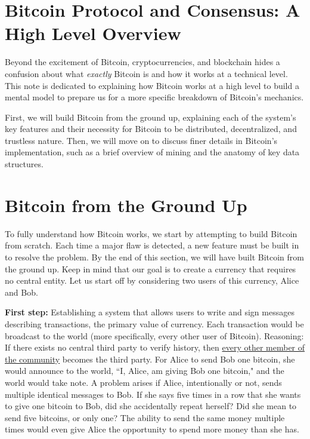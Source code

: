 \documentclass[full.tex]{subfiles}
\begin{document}
    \thispagestyle{firstpage}
    \vspace*{2\baselineskip}
    \section*{Bitcoin Protocol and Consensus: A High Level Overview}
    
    Beyond the excitement of Bitcoin, cryptocurrencies, and blockchain hides a confusion about what \textit{exactly} Bitcoin is and how it works at a technical level. This note is dedicated to explaining how Bitcoin works at a high level to build a mental model to prepare us for a more specific breakdown of Bitcoin's mechanics. 
    
    First, we will build Bitcoin from the ground up, explaining each of the system's key features and their necessity for Bitcoin to be distributed, decentralized, and trustless nature. Then, we will move on to discuss finer details in Bitcoin's implementation, such as a brief overview of mining and the anatomy of key data structures.
    
    \section*{Bitcoin from the Ground Up}
    
    To fully understand how Bitcoin works, we start by attempting to build Bitcoin from scratch. Each time a major flaw is detected, a new feature must be built in to resolve the problem. By the end of this section, we will have built Bitcoin from the ground up. Keep in mind that our goal is to create a currency that requires no central entity. Let us start off by considering two users of this currency, Alice and Bob.
    
    \textbf{First step:} Establishing a system that allows users to write and sign messages describing transactions, the primary value of currency. Each transaction would be broadcast to the world (more specifically, every other user of Bitcoin). Reasoning: If there exists no central third party to verify history, then \underline{every other member of the community} becomes the third party. For Alice to send Bob one bitcoin, she would announce to the world, ``I, Alice, am giving Bob one bitcoin," and the world would take note. A problem arises if Alice, intentionally or not, sends multiple identical messages to Bob. If she says five times in a row that she wants to give one bitcoin to Bob, did she accidentally repeat herself? Did she mean to send five bitcoins, or only one? The ability to send the same money multiple times would even give Alice the opportunity to spend more money than she has. 
    
\end{document}
